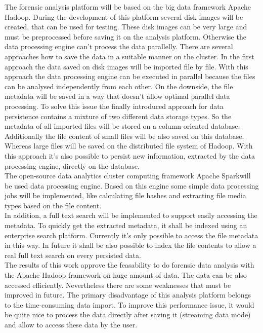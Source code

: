 \noindent
The forensic analysis platform will be based on the big data framework Apache Hadoop\textsuperscript{\textregistered}. During the development of this platform several disk images will be created, that can be used for testing. These disk images can be very large and must be preprocessed before saving it on the analysis platform. Otherwise the data processing engine can't process the data parallelly. There are several approaches how to save the data in a suitable manner on the cluster. In the first approach the data saved on disk images will be imported file by file. With this approach the data processing engine can be executed in parallel because the files can be analysed independently from each other. On the downside, the file metadata will be saved in a way that doesn't allow optimal parallel data processing. To solve this issue the finally introduced approach for data persistence contains a mixture of two different data storage types. So the metadata of all imported files will be stored on a column-oriented database. Additionally the file content of small files will be also saved on this database. Whereas large files will be saved on the distributed file system of Hadoop. With this approach it's also possible to persist new information, extracted by the data processing engine, directly on the database.\\

\noindent
The open-source data analytics cluster computing framework Apache Spark\texttrademark\thinspace will be used data processing engine. Based on this engine some simple data processing jobs will be implemented, like calculating file hashes and extracting file media types based on the file content.\\
In addition, a full text search will be implemented to support easily accessing the metadata. To quickly get the extracted metadata, it shall be indexed using an enterprise search platform. Currently it's only possible to access the file metadata in this way. In future it shall be also possible to index the file contents to allow a real full text search on every persisted data.\\

\noindent
The results of this work approve the feasability to do forensic data analysis with the Apache Hadoop framework on huge amount of data. The data can be also accessed efficiently. Nevertheless there are some weaknesses that must be improved in future. The primary disadvantage of this analysis platform belongs to the time-consuming data import. To improve this performance issue, it would be quite nice to process the data directly after saving it (streaming data mode) and allow to access these data by the user. 

